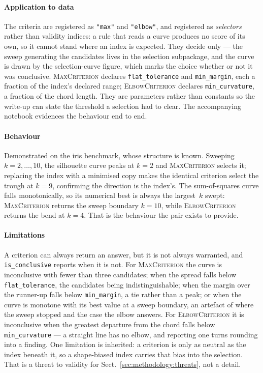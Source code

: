 \paragraph{Application to \projectname{} data}
\label{sec:measure:relative:application}
The criteria are registered as \texttt{"max"} and \texttt{"elbow"}, and
registered as \emph{selectors} rather than validity indices: a rule that
reads a curve produces no score of its own, so it cannot stand where an
index is expected. They decide only --- the sweep generating the
candidates lives in the selection subpackage, and the curve is drawn by
the selection-curve figure, which marks the choice whether or not it was
conclusive. \textsc{MaxCriterion}
declares \texttt{flat\_tolerance} and \texttt{min\_margin}, each a fraction
of the index's declared range; \textsc{ElbowCriterion} declares
\texttt{min\_curvature}, a fraction of the chord length. They are
parameters rather than constants so the write-up can state the threshold a
selection had to clear. The accompanying notebook evidences the behaviour
end to end.

\paragraph{Behaviour}
\label{sec:measure:relative:behaviour}
Demonstrated on the iris benchmark, whose structure is known. Sweeping
$k=2,\dots,10$, the silhouette curve peaks at $k=2$ and
\textsc{MaxCriterion} selects it; replacing the index with a minimised
copy makes the identical criterion select the trough at $k=9$, confirming
the direction is the index's. The sum-of-squares curve falls
monotonically, so its numerical best is always the largest~$k$ swept:
\textsc{MaxCriterion} returns the sweep boundary $k=10$, while
\textsc{ElbowCriterion} returns the bend at $k=4$. That is the behaviour
the pair exists to provide.

\paragraph{Limitations}
\label{sec:measure:relative:limitations}
A criterion can always return an answer, but it is not always warranted,
and \texttt{is\_conclusive} reports when it is not. For
\textsc{MaxCriterion} the curve is inconclusive with fewer than three
candidates; when the spread falls below \texttt{flat\_tolerance}, the
candidates being indistinguishable; when the margin over the runner-up
falls below \texttt{min\_margin}, a tie rather than a peak; or when the
curve is monotone with its best value at a sweep boundary, an artefact of
where the sweep stopped and the case the elbow answers. For
\textsc{ElbowCriterion} it is inconclusive when the greatest departure
from the chord falls below \texttt{min\_curvature} --- a straight line has
no elbow, and reporting one turns rounding into a finding. One limitation
is inherited: a criterion is only as neutral as the index beneath it, so a
shape-biased index carries that bias into the selection. That is a threat
to validity for Sect.~\ref{sec:methodology:threats}, not a detail.

